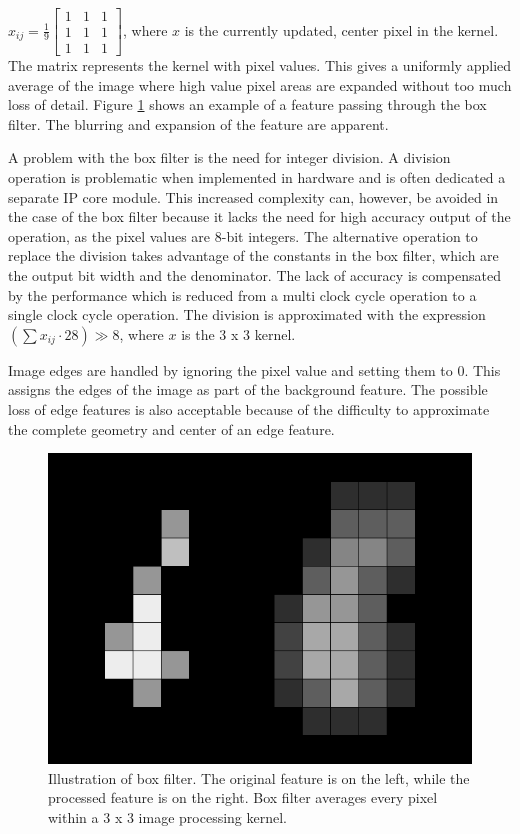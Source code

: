 \documentclass[12pt]{report}
\begin{document}
$x_{ij}=\frac{1}{9}
\begin{bmatrix}
1 & 1 & 1\\
1 & 1 & 1\\
1 & 1 & 1
\end{bmatrix}
$,
where $x$ is the currently updated, center pixel in the kernel. The matrix represents the kernel with pixel values. This gives a uniformly applied average of the image where high value pixel areas are expanded without too much loss of detail. Figure \ref*{fig:box_filter} shows an example of a feature passing through the box filter. The blurring and expansion of the feature are apparent. \citep{stpp}
\par
A problem with the box filter is the need for integer division. A division operation is problematic when implemented in hardware and is often dedicated a separate IP core module. This increased complexity can, however, be avoided in the case of the box filter because it lacks the need for high accuracy output of the operation, as the pixel values are 8-bit integers. The alternative operation to replace the division takes advantage of the constants in the box filter, which are the output bit width and the denominator. The lack of accuracy is compensated by the performance which is reduced from a multi clock cycle operation to a single clock cycle operation. The division is approximated with the expression
$
(\sum x_{ij} \cdot 28) \gg 8 
$, where $x$ is the 3 x 3 kernel. \citep{stpp}
\par
Image edges are handled by ignoring the pixel value and setting them to 0. This assigns the edges of the image as part of the background feature. The possible loss of edge features is also acceptable because of the difficulty to approximate the complete geometry and center of an edge feature. \citep{stpp}

\begin{figure}[h]
    \centering
    \includegraphics[scale=0.25]{figures/box_filter.png}
    \caption{Illustration of box filter. The original feature is on the left, while the processed feature is on the right. Box filter averages every pixel within a 3 x 3 image processing kernel.}
    \label{fig:box_filter}
\end{figure}
\end{document}
